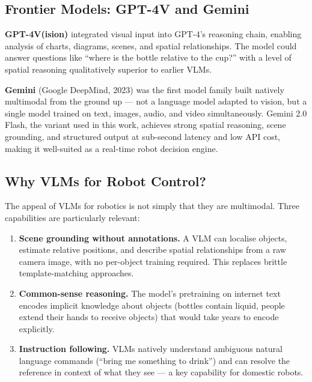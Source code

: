 \subsection{Frontier Models: GPT-4V and Gemini}

\textbf{GPT-4V(ision)} integrated visual input into GPT-4's reasoning chain,
enabling analysis of charts, diagrams, scenes, and spatial relationships.
The model could answer questions like ``where is the bottle relative to the cup?''
with a level of spatial reasoning qualitatively superior to earlier VLMs.

\textbf{Gemini} \cite{team2023gemini} (Google DeepMind, 2023) was the first model
family built natively multimodal from the ground up --- not a language model
adapted to vision, but a single model trained on text, images, audio, and video
simultaneously.
Gemini 2.0 Flash, the variant used in this work, achieves strong spatial reasoning,
scene grounding, and structured output at sub-second latency and low API cost,
making it well-suited as a real-time robot decision engine.

\subsection{Why VLMs for Robot Control?}

The appeal of VLMs for robotics is not simply that they are multimodal.
Three capabilities are particularly relevant:

\begin{enumerate}[noitemsep]
  \item \textbf{Scene grounding without annotations.}  A VLM can localise objects,
        estimate relative positions, and describe spatial relationships from a raw
        camera image, with no per-object training required.
        This replaces brittle template-matching approaches.

  \item \textbf{Common-sense reasoning.}  The model's pretraining on internet text
        encodes implicit knowledge about objects (bottles contain liquid, people extend
        their hands to receive objects) that would take years to encode explicitly.

  \item \textbf{Instruction following.}  VLMs natively understand ambiguous natural
        language commands (``bring me something to drink'') and can resolve the
        reference in context of what they see --- a key capability for domestic robots.
\end{enumerate}

